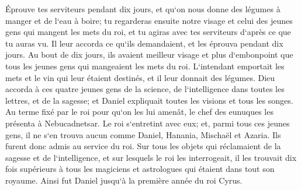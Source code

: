 \verse Éprouve tes serviteurs pendant dix jours, et qu`on nous donne des légumes à manger et de l`eau à boire; 
\verse tu regarderas ensuite notre visage et celui des jeunes gens qui mangent les mets du roi, et tu agiras avec tes serviteurs d`après ce que tu auras vu. 
\verse Il leur accorda ce qu`ils demandaient, et les éprouva pendant dix jours. 
\verse Au bout de dix jours, ils avaient meilleur visage et plus d`embonpoint que tous les jeunes gens qui mangeaient les mets du roi. 
\verse L`intendant emportait les mets et le vin qui leur étaient destinés, et il leur donnait des légumes. 
\verse Dieu accorda à ces quatre jeunes gens de la science, de l`intelligence dans toutes les lettres, et de la sagesse; et Daniel expliquait toutes les visions et tous les songes. 
\verse Au terme fixé par le roi pour qu`on les lui amenât, le chef des eunuques les présenta à Nebucadnetsar. 
\verse Le roi s`entretint avec eux; et, parmi tous ces jeunes gens, il ne s`en trouva aucun comme Daniel, Hanania, Mischaël et Azaria. Ils furent donc admis au service du roi. 
\verse Sur tous les objets qui réclamaient de la sagesse et de l`intelligence, et sur lesquels le roi les interrogeait, il les trouvait dix fois supérieurs à tous les magiciens et astrologues qui étaient dans tout son royaume. 
\verse Ainsi fut Daniel jusqu`à la première année du roi Cyrus. 


